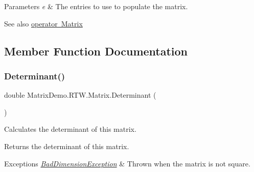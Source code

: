 \begin{DoxyParams}{Parameters}
{\em e} & The entries to use to populate the matrix.\\
\hline
\end{DoxyParams}
\begin{DoxySeeAlso}{See also}
\mbox{\hyperlink{class_matrix_demo_1_1_r_t_w_1_1_matrix_a0c737f7e6b54edac4d26b4f1c595ee92}{operator Matrix}}


\end{DoxySeeAlso}


\subsection{Member Function Documentation}
\mbox{\label{class_matrix_demo_1_1_r_t_w_1_1_matrix_a1bf322e5e6ff6ae935c74a91df5bb51c}} 
\subsubsection{\texorpdfstring{Determinant()}{Determinant()}}
{\footnotesize\ttfamily double Matrix\+Demo.\+R\+T\+W.\+Matrix.\+Determinant (\begin{DoxyParamCaption}{ }\end{DoxyParamCaption})}



Calculates the determinant of this matrix. 

\begin{DoxyReturn}{Returns}
the determinant of this matrix.
\end{DoxyReturn}

\begin{DoxyExceptions}{Exceptions}
{\em \mbox{\hyperlink{class_matrix_demo_1_1_r_t_w_1_1_bad_dimension_exception}{Bad\+Dimension\+Exception}}} & Thrown when the matrix is not square.\\
\hline
\end{DoxyExceptions}
\mbox{\label{class_matrix_demo_1_1_r_t_w_1_1_matrix_ac0f3f4cf1a7f5d36aff55a94d7ae6c92}} 
